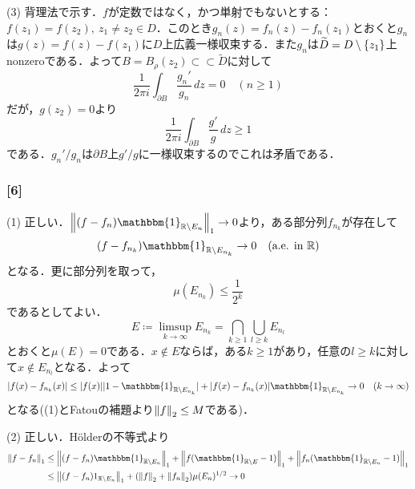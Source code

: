 \documentclass[a4j]{ltjsarticle}
\newcommand{\Rset}{\mathbb{R}}
\newcommand{\1}{\mathbbm{1}}
\numberwithin{equation}{section}
\theoremstyle{definition}
\begin{document}
(3) 背理法で示す．$f$が定数ではなく，かつ単射でもないとする：$f(z_1)=f(z_2),\ z_1\neq z_2\in D$．このとき$g_n(z)=f_n(z)-f_n(z_1)$とおくと$g_n$は$g(z)=f(z)-f(z_1)$に$D$上広義一様収束する．また$g_n$は$\widetilde{D}=D\setminus\qty{z_1}$上nonzeroである．よって$B=B_\rho(z_2)\subset\subset \widetilde{D}$に対して
\begin{equation}
    \frac{1}{2\pi i}\int_{\partial B}\frac{g_n'}{g_n }\,dz =0 \quad (n\geq 1)
\end{equation}
だが，$g(z_2)=0$より
\begin{equation}
    \frac{1}{2\pi i}\int_{\partial B}\frac{g'}{g}\,dz\geq 1 
\end{equation}
である．$g_n'/g_n$は$\partial B$上$g'/g$に一様収束するのでこれは矛盾である．

\subsubsection*{[6]}
(1) 正しい．$\norm{(f-f_n)\1_{\Rset\setminus E_n}}_1\to0$より，ある部分列$f_{n_k}$が存在して
\begin{equation}
    (f-f_{n_k})\1_{\Rset\setminus E_{n_k}}\to 0\quad (\text{a.e. in $\Rset$})
\end{equation}
となる．更に部分列を取って，
\begin{equation}
    \mu(E_{n_k})\leq \frac{1}{2^k}
\end{equation}
であるとしてよい．
\begin{equation}
    E\coloneq \limsup_{k\to \infty} E_{n_k} =\bigcap_{k\geq1}\bigcup_{l\geq k}E_{n_l}
\end{equation}
とおくと$\mu(E)=0$である．$x\notin E$ならば，ある$k\geq 1$があり，任意の$l\geq k$に対して$x\notin E_{n_l}$となる．よって
\begin{equation}
    \abs{f(x)-f_{n_k}(x)}\leq \abs{f(x)}|1-\1_{\Rset\setminus E_{n_k}}|+\abs{f(x)-f_{n_k}(x)}\1_{\Rset\setminus E_{n_k}}\to 0\quad (k\to\infty )
\end{equation}
となる((1)とFatouの補題より$\norm{f}_2\leq M$である)．

(2) 正しい．Hölderの不等式より
\begin{align}
    \norm{f-f_n}_{1}&\leq \norm{(f-f_n)\1_{\Rset\setminus E_n}}_1+\norm{f(\1_{\Rset\setminus E}-1)}_1+\norm{f_n(\1_{\Rset\setminus E_n}-1)}_{1}\\
    &\leq \norm{(f-f_n)1_{\Rset\setminus E_n}}_1+(\norm{f}_{2}+\norm{f_n}_2) \mu(E_n)^{1/2}\to0 
\end{align} 
\end{document}
